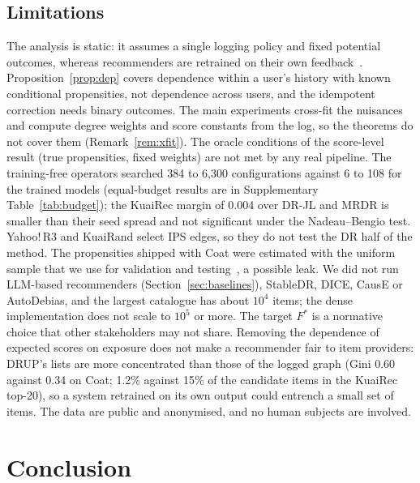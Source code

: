 \subsection{Limitations}
The analysis is static: it assumes a single logging policy and fixed potential
outcomes, whereas recommenders are retrained on their own
feedback~\citep{chaney2018confounding,hazrati2022evolution,perdomo2020performative}.
Proposition~\ref{prop:dep} covers dependence within a user's history with known
conditional propensities, not dependence across users, and the idempotent correction
needs binary outcomes. The main experiments cross-fit the nuisances and compute degree
weights and score constants from the log, so the theorems do not cover them
(Remark~\ref{rem:xfit}). The oracle conditions of the score-level result (true
propensities, fixed weights) are not met by any real pipeline. The training-free
operators searched 384 to 6{,}300 configurations against 6 to 108 for the trained models
(equal-budget results are in Supplementary Table~\ref{tab:budget}); the KuaiRec margin of
0.004 over DR-JL and MRDR is smaller than their seed spread and not significant under
the Nadeau--Bengio test. Yahoo!\,R3 and KuaiRand select IPS edges, so they do not test the
DR half of the method. The propensities shipped with Coat were estimated with the
uniform sample that we use for validation and testing~\citep{schnabel2016}, a
possible leak. We did not run LLM-based recommenders (Section~\ref{sec:baselines}),
StableDR, DICE, CausE or AutoDebias, and the largest catalogue has about $10^4$ items;
the dense implementation does not scale to $10^5$ or more. The target $F^*$ is a
normative choice that other stakeholders may not share. Removing the dependence of
expected scores on exposure does not make a recommender fair to item providers: DRUP's
lists are more concentrated than those of the logged graph (Gini 0.60 against 0.34 on
Coat; 1.2\% against 15\% of the candidate items in the KuaiRec top-20), so a system
retrained on its own output could entrench a small set of items. The data are public
and anonymised, and no human subjects are involved.

\section{Conclusion}

